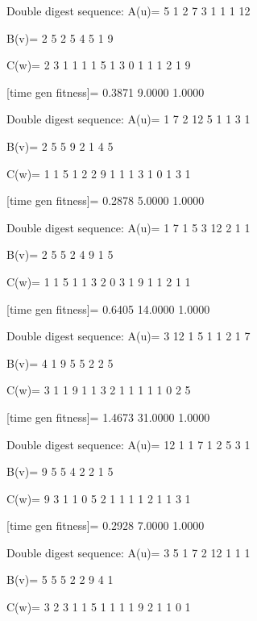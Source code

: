 Double digest sequence:
A(u)=
     5     1     2     7     3     1     1     1    12

B(v)=
     2     5     2     5     4     5     1     9

C(w)=
     2     3     1     1     1     1     5     1     3     0     1     1     1     2     1     9

[time gen fitness]=
    0.3871    9.0000    1.0000

Double digest sequence:
A(u)=
     1     7     2    12     5     1     1     3     1

B(v)=
     2     5     5     9     2     1     4     5

C(w)=
     1     1     5     1     2     2     9     1     1     1     3     1     0     1     3     1

[time gen fitness]=
    0.2878    5.0000    1.0000

Double digest sequence:
A(u)=
     1     7     1     5     3    12     2     1     1

B(v)=
     2     5     5     2     4     9     1     5

C(w)=
     1     1     5     1     1     3     2     0     3     1     9     1     1     2     1     1

[time gen fitness]=
    0.6405   14.0000    1.0000

Double digest sequence:
A(u)=
     3    12     1     5     1     1     2     1     7

B(v)=
     4     1     9     5     5     2     2     5

C(w)=
     3     1     1     9     1     1     3     2     1     1     1     1     1     0     2     5

[time gen fitness]=
    1.4673   31.0000    1.0000

Double digest sequence:
A(u)=
    12     1     1     7     1     2     5     3     1

B(v)=
     9     5     5     4     2     2     1     5

C(w)=
     9     3     1     1     0     5     2     1     1     1     1     2     1     1     3     1

[time gen fitness]=
    0.2928    7.0000    1.0000

Double digest sequence:
A(u)=
     3     5     1     7     2    12     1     1     1

B(v)=
     5     5     5     2     2     9     4     1

C(w)=
     3     2     3     1     1     5     1     1     1     1     9     2     1     1     0     1

